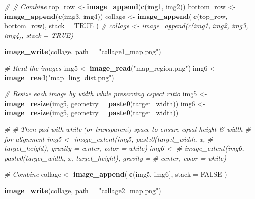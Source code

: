 \documentclass[
]{article}
\newenvironment{Shaded}{\begin{snugshade}}{\end{snugshade}}
\newcommand{\AttributeTok}[1]{\textcolor[rgb]{0.13,0.29,0.53}{#1}}
\newcommand{\CommentTok}[1]{\textcolor[rgb]{0.56,0.35,0.01}{\textit{#1}}}
\newcommand{\ConstantTok}[1]{\textcolor[rgb]{0.56,0.35,0.01}{#1}}
\newcommand{\FunctionTok}[1]{\textcolor[rgb]{0.13,0.29,0.53}{\textbf{#1}}}
\newcommand{\NormalTok}[1]{#1}
\newcommand{\OtherTok}[1]{\textcolor[rgb]{0.56,0.35,0.01}{#1}}
\newcommand{\StringTok}[1]{\textcolor[rgb]{0.31,0.60,0.02}{#1}}
\begin{document}
\begin{Shaded}
\begin{Highlighting}[]
\CommentTok{\# \# Combine}
\NormalTok{top\_row }\OtherTok{\textless{}{-}} \FunctionTok{image\_append}\NormalTok{(}\FunctionTok{c}\NormalTok{(img1, img2))}
\NormalTok{bottom\_row }\OtherTok{\textless{}{-}} \FunctionTok{image\_append}\NormalTok{(}\FunctionTok{c}\NormalTok{(img3, img4))}
\NormalTok{collage }\OtherTok{\textless{}{-}} \FunctionTok{image\_append}\NormalTok{(}
    \FunctionTok{c}\NormalTok{(top\_row, bottom\_row),}
    \AttributeTok{stack =} \ConstantTok{TRUE}
\NormalTok{)}
\CommentTok{\# collage \textless{}{-} image\_append(c(img1, img2, img3, img4), stack = TRUE)}

\FunctionTok{image\_write}\NormalTok{(collage, }\AttributeTok{path =} \StringTok{"collage1\_map.png"}\NormalTok{)}



\CommentTok{\# Read the images}
\NormalTok{img5 }\OtherTok{\textless{}{-}} \FunctionTok{image\_read}\NormalTok{(}\StringTok{"map\_region.png"}\NormalTok{)}
\NormalTok{img6 }\OtherTok{\textless{}{-}} \FunctionTok{image\_read}\NormalTok{(}\StringTok{"map\_ling\_dist.png"}\NormalTok{)}

\CommentTok{\# Resize each image by width while preserving aspect ratio}
\NormalTok{img5 }\OtherTok{\textless{}{-}} \FunctionTok{image\_resize}\NormalTok{(img5, }\AttributeTok{geometry =} \FunctionTok{paste0}\NormalTok{(target\_width))}
\NormalTok{img6 }\OtherTok{\textless{}{-}} \FunctionTok{image\_resize}\NormalTok{(img6, }\AttributeTok{geometry =} \FunctionTok{paste0}\NormalTok{(target\_width))}

\CommentTok{\# \# Then pad with white (or transparent) space to ensure equal height \& width}
\CommentTok{\# for alignment img5 \textless{}{-} image\_extent(img5, paste0(target\_width, \textquotesingle{}x\textquotesingle{},}
\CommentTok{\# target\_height), gravity = \textquotesingle{}center\textquotesingle{}, color = \textquotesingle{}white\textquotesingle{}) img6 \textless{}{-}}
\CommentTok{\# image\_extent(img6, paste0(target\_width, \textquotesingle{}x\textquotesingle{}, target\_height), gravity =}
\CommentTok{\# \textquotesingle{}center\textquotesingle{}, color = \textquotesingle{}white\textquotesingle{})}

\CommentTok{\# Combine}
\NormalTok{collage }\OtherTok{\textless{}{-}} \FunctionTok{image\_append}\NormalTok{(}
    \FunctionTok{c}\NormalTok{(img5, img6),}
    \AttributeTok{stack =} \ConstantTok{FALSE}
\NormalTok{)}

\FunctionTok{image\_write}\NormalTok{(collage, }\AttributeTok{path =} \StringTok{"collage2\_map.png"}\NormalTok{)}
\end{Highlighting}
\end{Shaded}
\end{document}
